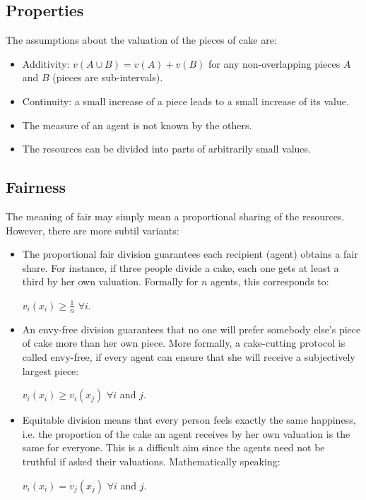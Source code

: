 \subsection{Properties}

The assumptions about the valuation of the pieces of cake are:
\begin{itemize}
\item Additivity: $v(A \cup B) = v(A) + v(B)$ for any non-overlapping pieces $A$ and $B$
(pieces are sub-intervals). 
\item 
Continuity: a small increase of a piece leads to a small increase of its value. 
\item The measure of an agent is not known by the others.
\item The resources can be divided into parts of arbitrarily small values.
\end{itemize}

\subsection{Fairness}

The meaning of fair may simply mean a proportional sharing of the resources. 
However, there are more subtil variants:

\begin{itemize}
\item The proportional fair division guarantees each recipient (agent) obtains a fair share. 
For instance, if three people divide a cake, each one gets at least a third by her own valuation. 
Formally  for $n$ agents, this corresponds to:

 $v_i(x_i) \geq \frac{1}{n}$ $\forall i$.
\item An envy-free division guarantees that no one will prefer somebody else's piece of cake more than her own piece. 
More formally,  a cake-cutting protocol is called envy-free, if every agent can ensure that she will receive a subjectively largest piece:

 $v_i(x_i) \geq v_i(x_j)$ $\forall i$ and $j$.
\item Equitable division means that every person feels exactly the same happiness, 
i.e. the proportion of the cake an agent receives by her own valuation is the same for everyone. 
This is a difficult aim since the agents need not be truthful if asked their valuations.
Mathematically speaking:  

$v_i(x_i) = v_j(x_j)$ $\forall i$ and $j$.
 \end{itemize}

